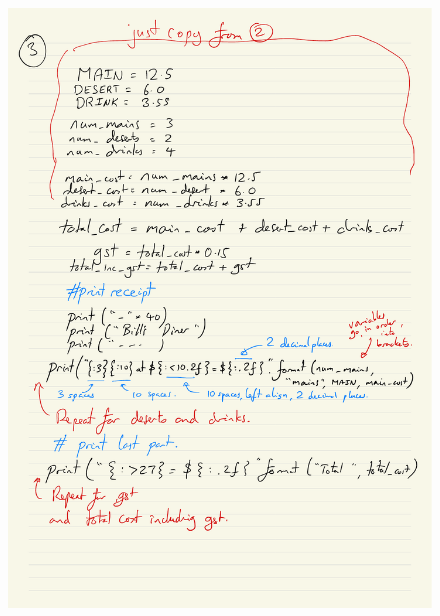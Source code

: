 \documentclass[a4paper,12pt]{article}
\begin{document}
\begin{figure} [!h]
	\centering
	\includegraphics[width=12cm]{iterative_processes/Components_detailed_p3.pdf}
\end{figure}
\newpage




\newpage



\newpage
\end{document}
